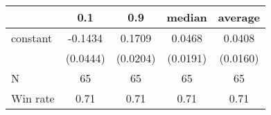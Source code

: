 \begin{tabular}{lcccc}
\hline
         &   0.1    &   0.9    &  median  & average   \\
\midrule
\midrule
constant & -0.1434  & 0.1709   & 0.0468   & 0.0408    \\
         & (0.0444) & (0.0204) & (0.0191) & (0.0160)  \\
N        & 65       & 65       & 65       & 65        \\
Win rate & 0.71     & 0.71     & 0.71     & 0.71      \\
\hline
\end{tabular}